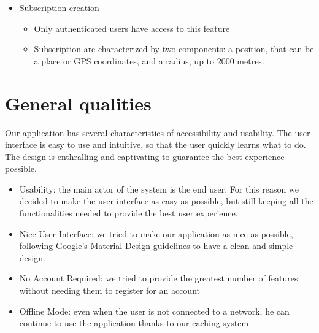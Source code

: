 \documentclass[a4paper]{scrreprt}
\begin{document}
\begin{itemize}
\item Subscription creation
\begin{itemize}
\item Only authenticated users have access to this feature
\item Subscription are characterized by two components: a position, that can be a place or GPS coordinates, and a radius, up to 2000 metres.
\end{itemize}

\end{itemize}

\section{General qualities}
Our application has several characteristics of accessibility and usability. The user interface is easy to use and intuitive, so that the user quickly learns what to do. The design is enthralling and captivating to guarantee the best experience possible.
\begin{itemize}
\item Usability: the main actor of the system is the end user. For this reason we decided to make the user interface as easy as possible, but still keeping all the functionalities needed to provide the best user experience.
\item Nice User Interface: we tried to make our application as nice as possible, following Google's Material Design guidelines to have a clean and simple design.
\item No Account Required: we tried to provide the greatest number of features without needing them to register for an account
\item Offline Mode: even when the user is not connected to a network, he can continue to use the application thanks to our caching system
\end{itemize}
\end{document}
